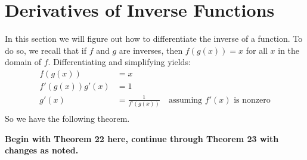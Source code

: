 \section{Derivatives of Inverse Functions}

In this section we will figure out how to differentiate the inverse of a function. To do so, we recall that if $f$ and $g$ are inverses, then $f(g(x))=x$ for all $x$ in the domain of $f$. Differentiating and simplifying yields:
\begin{equation*}
\begin{split}
f(g(x))&=x\\
f'(g(x))g'(x)&=1\\
g'(x)&=\frac 1{f'(g(x))} \quad\text{assuming $f'(x)$ is nonzero}\\
\end{split}
\end{equation*}
So we have the following theorem.

{\color{blue} \bfseries Begin with Theorem 22 here, continue through Theorem 23 with changes as noted.}